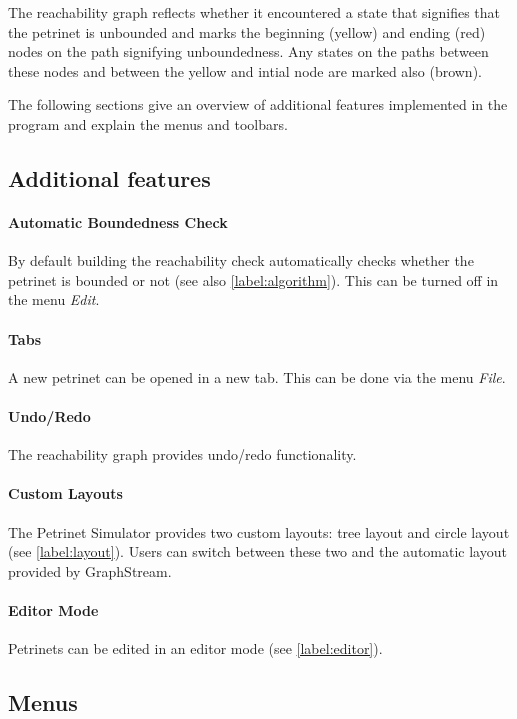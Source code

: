 \documentclass[10pt, a4paper]{article}
\begin{document}
The reachability graph reflects whether it encountered a state that signifies that the petrinet is unbounded and marks the beginning (yellow) and ending (red) nodes on the path signifying unboundedness. Any states on the paths between these nodes and between the yellow and intial node are marked also (brown).

The following sections give an overview of additional features implemented in the program and explain the menus and toolbars.

\subsection{Additional features}

\paragraph{Automatic Boundedness Check} By default building the reachability check automatically checks whether the petrinet is bounded or not (see also \ref{label:algorithm}). This can be turned off in the menu \textit{Edit}.

\paragraph{Tabs} A new petrinet can be opened in a new tab. This can be done via the menu \textit{File}.

\paragraph{Undo/Redo} The reachability graph provides undo/redo functionality.

\paragraph{Custom Layouts} The Petrinet Simulator provides two custom layouts: tree layout and circle layout (see \ref{label:layout}). Users can switch between these two and the automatic layout provided by GraphStream.

\paragraph{Editor Mode} Petrinets can be edited in an editor mode (see \ref{label:editor}).


\subsection{Menus}
\end{document}
